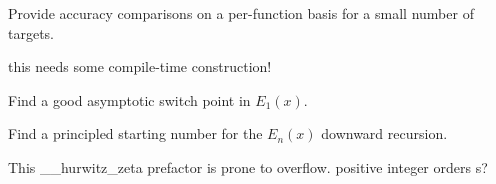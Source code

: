
\begin{DoxyRefList}
\item[\label{todo__todo000001}%
\hypertarget{todo__todo000001}{}%
page \hyperlink{index}{Mathematical Special Functions} ]Provide accuracy comparisons on a per-\/function basis for a small number of targets. 
\item[\label{todo__todo000002}%
\hypertarget{todo__todo000002}{}%
Member \hyperlink{namespacestd_1_1____detail_a3fe9fa143beb1a5d9f8ca18b3783f650}{std\+:\+:\+\_\+\+\_\+detail\+:\+:\+\_\+\+\_\+dawson\+\_\+const\+\_\+frac} (\+\_\+\+Tp \+\_\+\+\_\+x)]this needs some compile-\/time construction!  
\item[\label{todo__todo000004}%
\hypertarget{todo__todo000004}{}%
Member \hyperlink{namespacestd_1_1____detail_a665eb0c524b929c035d88bbb17815917}{std\+:\+:\+\_\+\+\_\+detail\+:\+:\+\_\+\+\_\+expint\+\_\+\+E1} (\+\_\+\+Tp \+\_\+\+\_\+x)]Find a good asymptotic switch point in $ E_1(x) $.  
\item[\label{todo__todo000003}%
\hypertarget{todo__todo000003}{}%
Member \hyperlink{namespacestd_1_1____detail_a9b0a2050324390fb6c4a584170289a99}{std\+:\+:\+\_\+\+\_\+detail\+:\+:\+\_\+\+\_\+expint\+\_\+\+En\+\_\+recursion} (unsigned int \+\_\+\+\_\+n, \+\_\+\+Tp \+\_\+\+\_\+x)]Find a principled starting number for the $ E_n(x) $ downward recursion.  
\item[\label{todo__todo000005}%
\hypertarget{todo__todo000005}{}%
Member \hyperlink{namespacestd_1_1____detail_a7eb061915bad44dd29443b3476eaa7a0}{std\+:\+:\+\_\+\+\_\+detail\+:\+:\+\_\+\+\_\+hurwitz\+\_\+zeta} (\+\_\+\+Tp \+\_\+\+\_\+s, std\+::complex$<$ \+\_\+\+Tp $>$ \+\_\+\+\_\+a)]This \+\_\+\+\_\+hurwitz\+\_\+zeta prefactor is prone to overflow. positive integer orders s? 
\end{DoxyRefList}